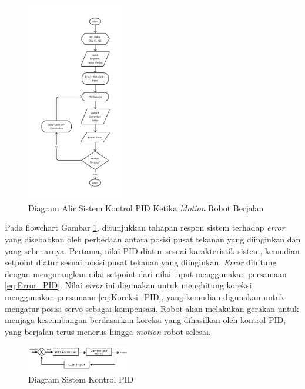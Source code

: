\begin{enumerate}[label=\Alph*.]
    \begin{figure} [h] \centering
      \includegraphics[width=0.38\textwidth]{gambar/Flow_Kontrol.png}
      \caption{Diagram Alir Sistem Kontrol PID Ketika \textit{Motion} Robot Berjalan}
      \label{fig:Flow_Kontrol}
    \end{figure}
    
    \hspace*{1em} Pada flowchart Gambar \ref{fig:Flow_Kontrol}, ditunjukkan tahapan respon sistem terhadap \textit{error} yang disebabkan oleh perbedaan antara posisi pusat tekanan yang diinginkan dan yang sebenarnya. Pertama, nilai PID diatur sesuai karakteristik sistem, kemudian setpoint diatur sesuai posisi pusat tekanan yang diinginkan. \textit{Error} dihitung dengan mengurangkan nilai setpoint dari nilai input menggunakan persamaan \ref{eq:Error_PID}. Nilai \textit{error} ini digunakan untuk menghitung koreksi menggunakan persamaan \ref{eq:Koreksi_PID}, yang kemudian digunakan untuk mengatur posisi servo sebagai kompensasi. Robot akan melakukan gerakan untuk menjaga keseimbangan berdasarkan koreksi yang dihasilkan oleh kontrol PID, yang berjalan terus menerus hingga \textit{motion} robot selesai.

    \begin{figure} [h] \centering
      \includegraphics[width=0.4\textwidth]{gambar/pid_diagram.png}
      \caption{Diagram Sistem Kontrol PID}
      \label{fig:Control_System}
    \end{figure}


\end{enumerate}
